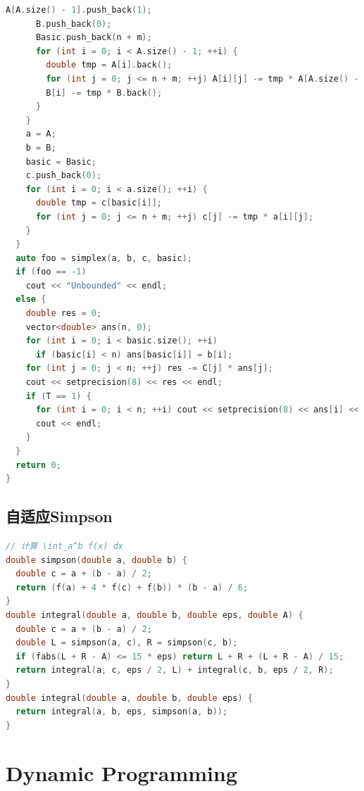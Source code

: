 \documentclass[twoside]{article}
\begin{document}
\begin{lstlisting}[language=c++]
      A[A.size() - 1].push_back(1);
      B.push_back(0);
      Basic.push_back(n + m);
      for (int i = 0; i < A.size() - 1; ++i) {
        double tmp = A[i].back();
        for (int j = 0; j <= n + m; ++j) A[i][j] -= tmp * A[A.size() - 1][j];
        B[i] -= tmp * B.back();
      }
    }
    a = A;
    b = B;
    basic = Basic;
    c.push_back(0);
    for (int i = 0; i < a.size(); ++i) {
      double tmp = c[basic[i]];
      for (int j = 0; j <= n + m; ++j) c[j] -= tmp * a[i][j];
    }
  }
  auto foo = simplex(a, b, c, basic);
  if (foo == -1)
    cout << "Unbounded" << endl;
  else {
    double res = 0;
    vector<double> ans(n, 0);
    for (int i = 0; i < basic.size(); ++i)
      if (basic[i] < n) ans[basic[i]] = b[i];
    for (int j = 0; j < n; ++j) res -= C[j] * ans[j];
    cout << setprecision(8) << res << endl;
    if (T == 1) {
      for (int i = 0; i < n; ++i) cout << setprecision(8) << ans[i] << ' ';
      cout << endl;
    }
  }
  return 0;
}

\end{lstlisting}
\subsection{自适应Simpson}
\begin{lstlisting}[language=c++]
// 计算 \int_a^b f(x) dx
double simpson(double a, double b) {
  double c = a + (b - a) / 2;
  return (f(a) + 4 * f(c) + f(b)) * (b - a) / 6;
}
double integral(double a, double b, double eps, double A) {
  double c = a + (b - a) / 2;
  double L = simpson(a, c), R = simpson(c, b);
  if (fabs(L + R - A) <= 15 * eps) return L + R + (L + R - A) / 15;
  return integral(a, c, eps / 2, L) + integral(c, b, eps / 2, R);
}
double integral(double a, double b, double eps) {
  return integral(a, b, eps, simpson(a, b));
}

\end{lstlisting}

\section{Dynamic Programming}
\end{document}

